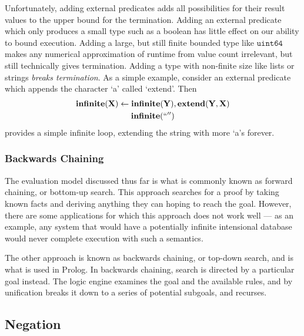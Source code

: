 Unfortunately, adding external predicates adds all possibilities for their result values to the upper bound for the termination.
Adding an external predicate which only produces a small type such as a boolean has little effect on our ability to bound execution.
Adding a large, but still finite bounded type like $\texttt{uint64}$ makes any numerical approximation of runtime from value count irrelevant, but still technically gives termination.
Adding a type with non-finite size like lists or strings \emph{breaks termination}.
As a simple example, consider an external predicate which appends the character `a' called `extend'. Then
\begin{gather*}
  {\bf infinite}({\bf X}) \leftarrow {\bf infinite}({\bf Y}), {\bf extend}({\bf Y}, {\bf X})\\
  {\bf infinite}(``'')
\end{gather*}
provides a simple infinite loop, extending the string with more `a's forever.

\subsubsection{Backwards Chaining}
\label{sec:bchain}
The evaluation model discussed thus far is what is commonly known as forward chaining, or bottom-up search.
This approach searches for a proof by taking known facts and deriving anything they can hoping to reach the goal.
However, there are some applications for which this approach does not work well --- as an example, any system that would have a potentially infinite intensional database would never complete execution with such a semantics.

The other approach is known as backwards chaining, or top-down search, and is what is used in Prolog.
In backwards chaining, search is directed by a particular goal instead.
The logic engine examines the goal and the available rules, and by unification breaks it down to a series of potential subgoals, and recurses.

\subsection{Negation}
